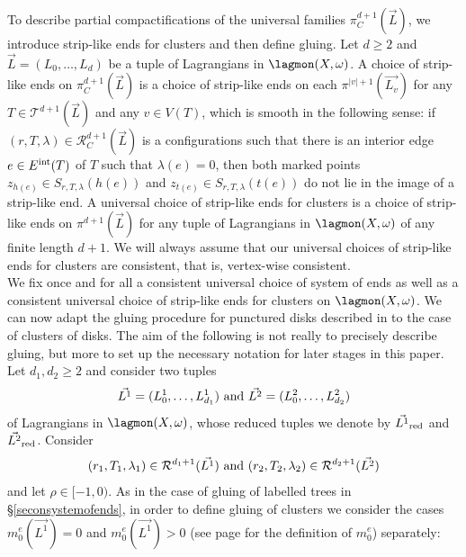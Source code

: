 To describe partial compactifications of the universal families $\pi^{d+1}_C(\vec{L})$, we introduce strip-like ends for clusters and then define gluing. Let $d\geq 2$ and $\vec{L}=(L_0,\ldots,L_d)$ be a tuple of Lagrangians in $\lagmon(X,\omega)$. A choice of strip-like ends on $\pi^{d+1}_C(\vec{L})$ is a choice of strip-like ends on each $\pi^{|v|+1}(\vec{L_v})$ for any $T\in \mathcal{T}^{d+1}(\vec{L})$ and any $v\in V(T)$, which is smooth in the following sense: if $(r,T,\lambda)\in \mathcal{R}^{d+1}_C(\vec{L})$ is a configurations such that there is an interior edge $e\in E^\textnormal{int}(T)$ of $T$ such that $\lambda(e)=0$, then both marked points $z_{h(e)}\in S_{r,T,\lambda}(h(e))$ and $z_{t(e)}\in S_{r,T,\lambda}(t(e))$ do not lie in the image of a strip-like end. A universal choice of strip-like ends for clusters is a choice of strip-like ends on $\pi^{d+1}(\vec{L})$ for any tuple of Lagrangians in $\lagmon(X,\omega)$ of any finite length $d+1$. We will always assume that our universal choices of strip-like ends for clusters are consistent, that is, vertex-wise consistent. \\

We fix once and for all a consistent universal choice of system of ends as well as a consistent universal choice of strip-like ends for clusters on $\lagmon(X,\omega)$. We can now adapt the gluing procedure for punctured disks described in \cite[Section (9e)]{Se:book-fukaya-categ} to the case of clusters of disks. The aim of the following is not really to precisely describe gluing, but more to set up the necessary notation for later stages in this paper.\\
Let $d_1,d_2\geq 2$ and consider two tuples $$\vec{L^1}=(L_0^1,\ldots, L_{d_1}^1) \textnormal{   and   } \vec{L^2}=(L_0^2,\ldots, L_{d_2}^2)$$ of Lagrangians in $\lagmon(X,\omega)$, whose reduced tuples we denote by $\vec{L^1}_\textnormal{red}$ and $\vec{L^2}_\textnormal{red}$.  Consider $$(r_1,T_1,\lambda_1)\in \mathcal{R}^{d_1+1}(\vec{L^1}) \textnormal{   and   }(r_2,T_2,\lambda_2)\in  \mathcal{R}^{d_2+1}(\vec{L^2})$$ and let $\rho \in [-1,0)$. As in the case of gluing of labelled trees in \S \ref{seconsystemofends}, in order to define gluing of clusters we consider the cases $m_0^e(\vec{L^1})=0$ and $m_0^e(\vec{L^1})>0$ (see page \pageref{defofmis} for the definition of $m_0^e$) separately:

